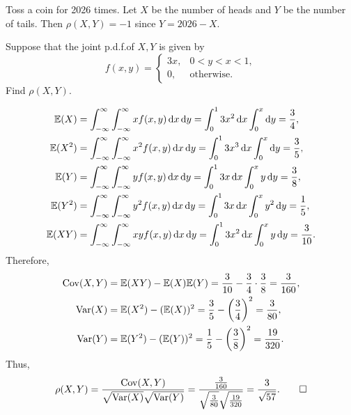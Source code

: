 \begin{example}
  Toss a coin for 2026 times. Let \(X\) be the number of heads and \(Y\) be the number of tails. Then \(\rho(X, Y) = -1\) since \(Y = 2026 - X\).
\end{example}

\begin{example}
  Suppose that the joint p.d.f.\@ of \(X, Y\) is given by
  \[
    f(x, y) = \begin{cases}
      3x, & 0 < y < x < 1, \\
      0, & \text{otherwise}.
    \end{cases}
  \]
  Find \(\rho(X, Y)\).
\end{example}
\begin{solution}
  \begin{align*}
    \mathbb{E}(X) &= \int_{-\infty}^\infty \int_{-\infty}^\infty x f(x, y) \, \mathrm{d} x \, \mathrm{d} y = \int_0^1 3x^2 \, \mathrm{d} x \int_0^x \mathrm{d} y = \frac{3}{4}, \\
    \mathbb{E}(X^2) &= \int_{-\infty}^\infty \int_{-\infty}^\infty x^2 f(x, y) \, \mathrm{d} x \, \mathrm{d} y = \int_0^1 3x^3 \, \mathrm{d} x \int_0^x \mathrm{d} y = \frac{3}{5}, \\
    \mathbb{E}(Y) &= \int_{-\infty}^\infty \int_{-\infty}^\infty y f(x, y) \, \mathrm{d} x \, \mathrm{d} y = \int_0^1 3x \,\mathrm{d} x \int_0^x y \, \mathrm{d} y = \frac{3}{8}, \\
    \mathbb{E}(Y^2) &= \int_{-\infty}^\infty \int_{-\infty}^\infty y^2 f(x, y) \, \mathrm{d} x \, \mathrm{d} y = \int_0^1 3x \,\mathrm{d} x \int_0^x y^2 \, \mathrm{d} y = \frac{1}{5}, \\
    \mathbb{E}(XY) &= \int_{-\infty}^\infty \int_{-\infty}^\infty xy f(x, y) \, \mathrm{d} x \, \mathrm{d} y = \int_0^1 3x^2 \,\mathrm{d} x \int_0^x y \, \mathrm{d} y = \frac{3}{10}.
  \end{align*}
  Therefore,
  \begin{align*}
    \mathrm{Cov}(X, Y) &= \mathbb{E}(XY) - \mathbb{E}(X) \mathbb{E}(Y) = \frac{3}{10} - \frac{3}{4} \cdot \frac{3}{8} = \frac{3}{160}, \\
    \mathrm{Var}(X) &= \mathbb{E}(X^2) - (\mathbb{E}(X))^2 = \frac{3}{5} - \left(\frac{3}{4}\right)^2 = \frac{3}{80}, \\
    \mathrm{Var}(Y) &= \mathbb{E}(Y^2) - (\mathbb{E}(Y))^2 = \frac{1}{5} - \left(\frac{3}{8}\right)^2 = \frac{19}{320}.
  \end{align*}
  Thus,
  \[
    \rho(X, Y) = \frac{\mathrm{Cov}(X, Y)}{\sqrt{\mathrm{Var}(X)} \sqrt{\mathrm{Var}(Y)}} = \frac{\frac{3}{160}}{\sqrt{\frac{3}{80}} \sqrt{\frac{19}{320}}} = \frac{3}{\sqrt{57}}. \qedhere
  \]
\end{solution}

